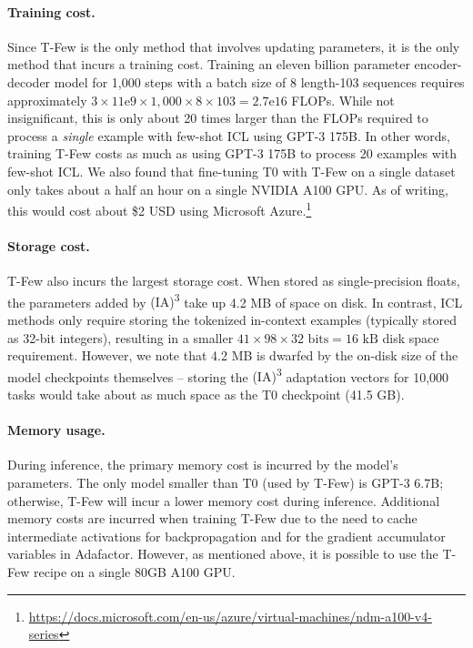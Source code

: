 \paragraph{Training cost.}

Since {\selectfont T-Few} is the only method that involves updating parameters, it is the only method that incurs a training cost. Training an eleven billion parameter encoder-decoder model for 1,000 steps with a batch size of 8 length-103 sequences requires approximately $3 \times 11{\text{e}}9 \times 1,000 \times 8 \times 103 = 2.7{\text{e}}16$ FLOPs. While not insignificant, this is only about 20 times larger than the FLOPs required to process a \textit{single} example with few-shot ICL using GPT-3 175B. In other words, training {\selectfont T-Few} costs as much as using GPT-3 175B to process 20 examples with few-shot ICL. We also found that fine-tuning T0 with {\selectfont T-Few} on a single dataset only takes about a half an hour on a single NVIDIA A100 GPU. As of writing, this would cost about \$2 USD using Microsoft Azure.\footnote{\url{https://docs.microsoft.com/en-us/azure/virtual-machines/ndm-a100-v4-series}}

\paragraph{Storage cost.}

{\selectfont T-Few} also incurs the largest storage cost. When stored as single-precision floats, the parameters added by {\selectfont (IA)\textsuperscript{3}} take up 4.2 MB of space on disk. In contrast, ICL methods only require storing the tokenized in-context examples (typically stored as 32-bit integers), resulting in a smaller $41 \times 98 \times 32\text{ bits} = 16\text{ kB}$ disk space requirement. However, we note that 4.2 MB is dwarfed by the on-disk size of the model checkpoints themselves  -- storing the {\selectfont (IA)\textsuperscript{3}} adaptation vectors for 10,000 tasks would take about as much space as the T0 checkpoint (41.5 GB).

\paragraph{Memory usage.}

During inference, the primary memory cost is incurred by the model's parameters. The only model smaller than T0 (used by {\selectfont T-Few}) is GPT-3 6.7B; otherwise, {\selectfont T-Few} will incur a lower memory cost during inference. Additional memory costs are incurred when training {\selectfont T-Few} due to the need to cache intermediate activations for backpropagation and for the gradient accumulator variables in Adafactor. However, as mentioned above, it is possible to use the {\selectfont T-Few} recipe on a single 80GB A100 GPU.

